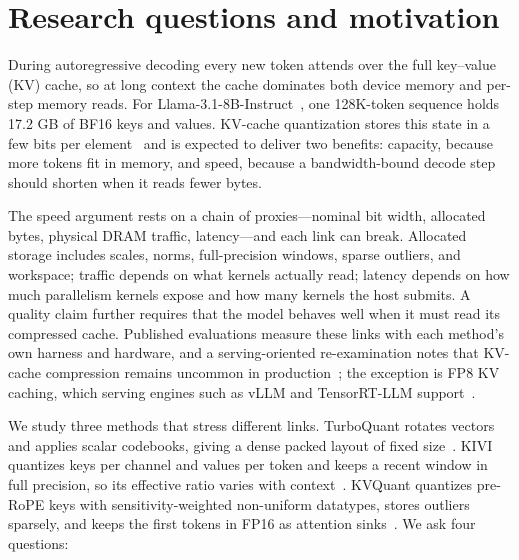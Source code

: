 \documentclass{article}
\newif\ifappendixonly
\begin{document}
\ifappendixonly\else

\section{Research questions and motivation}
\label{sec:intro}

During autoregressive decoding every new token attends over the full key--value (KV) cache, so at long context the cache dominates both device memory and per-step memory reads.
For Llama-3.1-8B-Instruct~\citep{grattafiori_llama3}, one 128K-token sequence holds 17.2 GB of BF16 keys and values.
KV-cache quantization stores this state in a few bits per element~\citep{hooper_kvquant,liu_kivi,zandieh_turboquant,zandieh_qjl,kang_gear,he_zipcache,duanmu_skvq,yang_notokenleft,wang_squat,tayaranian_innerq} and is expected to deliver two benefits: capacity, because more tokens fit in memory, and speed, because a bandwidth-bound decode step should shorten when it reads fewer bytes.

The speed argument rests on a chain of proxies---nominal bit width, allocated bytes, physical DRAM traffic, latency---and each link can break.
Allocated storage includes scales, norms, full-precision windows, sparse outliers, and workspace; traffic depends on what kernels actually read; latency depends on how much parallelism kernels expose and how many kernels the host submits.
A quality claim further requires that the model behaves well when it must read its compressed cache.
Published evaluations measure these links with each method's own harness and hardware, and a serving-oriented re-examination notes that KV-cache compression remains uncommon in production~\citep{gao_rethinking}; the exception is FP8 KV caching, which serving engines such as vLLM and TensorRT-LLM support~\citep{vllm_fp8kv,nvidia_trtllm_quant}.

We study three methods that stress different links.
TurboQuant rotates vectors and applies scalar codebooks, giving a dense packed layout of fixed size~\citep{zandieh_turboquant}.
KIVI quantizes keys per channel and values per token and keeps a recent window in full precision, so its effective ratio varies with context~\citep{liu_kivi}.
KVQuant quantizes pre-RoPE keys with sensitivity-weighted non-uniform datatypes, stores outliers sparsely, and keeps the first tokens in FP16 as attention sinks~\citep{hooper_kvquant,xiao_streaming}.
We ask four questions:
\end{document}
